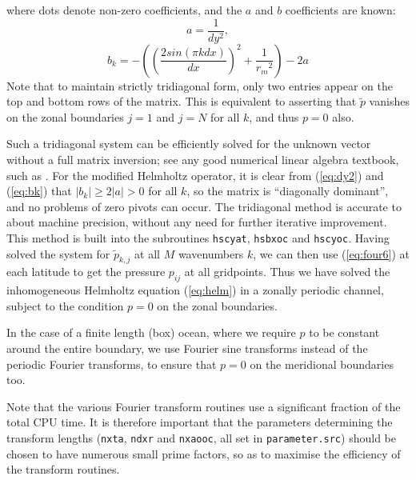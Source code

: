 \documentclass[11pt, a4paper,twoside]{article}
\newcommand{\rdm}[0]{{r_m}}
\numberwithin{equation}{section}
\begin{document}
where dots denote non-zero coefficients, and the $a$ and $b$ coefficients are known:
\begin{equation}\label{eq:dy2}
a = \frac{1}{dy^2},
\end{equation}
\begin{equation}\label{eq:bk}
 b_k = - \left( \left( \frac{2 sin(\pi k dx)}{dx} \right)^2 + \frac{1}{\rdm^2}\right) - 2a
\end{equation}
Note that to maintain strictly tridiagonal form, only two entries appear on the top and bottom rows of the matrix.
This is equivalent to asserting that $\tilde{p}$ vanishes on the zonal boundaries $j=1$ and $j=N$ for all $k$, and thus $p=0$ also.

Such a tridiagonal system can be efficiently solved for the unknown vector without a full matrix inversion; see any good numerical linear algebra textbook, such as \citet{press:92}.
For the modified Helmholtz operator, it is clear from (\ref{eq:dy2}) and (\ref{eq:bk}) that $|b_k| \ge 2|a| > 0$ for all $k$, so the matrix is ``diagonally dominant'', and no problems of zero pivots can occur.
The tridiagonal method is accurate to about machine precision, without any need for further iterative improvement. 
This method is built into the subroutines \verb=hscyat=, \verb=hsbxoc= and \verb=hscyoc=.
Having solved the system for $\tilde{p}_{k,j}$ at all $M$ wavenumbers $k$, we can then use (\ref{eq:four6}) at each latitude to get the pressure $p_{ij}$ at all gridpoints.
Thus we have solved the inhomogeneous Helmholtz equation (\ref{eq:helm}) in a zonally periodic channel, subject to the condition $p = 0$ on the zonal boundaries.

In the case of a finite length (box) ocean, where we require $p$ to be constant around the entire boundary, we use Fourier sine transforms instead of the periodic Fourier transforms, to ensure that $p = 0$ on the meridional boundaries too.

Note that the various Fourier transform routines use a significant fraction of the total CPU time.
It is therefore important that the parameters determining the transform lengths (\verb=nxta=, \verb=ndxr= and \verb=nxaooc=, all set in \verb=parameter.src=) should be chosen to have numerous small prime factors, so as to maximise the efficiency of the transform routines.
\end{document}

